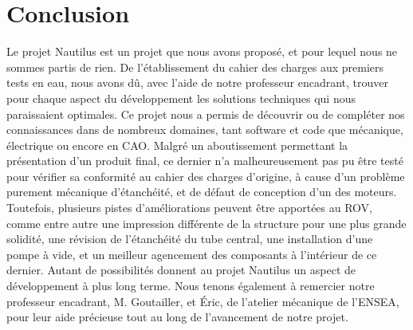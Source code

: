\documentclass[a4paper,11pt]{report}
\begin{document}
\chapter{Conclusion}

Le projet Nautilus est un projet que nous avons proposé, et pour lequel nous ne sommes partis de rien. De l'établissement du cahier des charges aux premiers tests en eau, nous avons dû, avec l'aide de notre professeur encadrant, trouver pour chaque aspect du développement les solutions techniques qui nous paraissaient optimales. Ce projet nous a permis de découvrir ou de compléter nos connaissances dans de nombreux domaines, tant software et code que mécanique, électrique ou encore en CAO. Malgré un aboutissement permettant la présentation d'un produit final, ce dernier n'a malheureusement pas pu être testé pour vérifier sa conformité au cahier des charges d'origine, à cause d'un problème purement mécanique d'étanchéité, et de défaut de conception d'un des moteurs. Toutefois, plusieurs pistes d'améliorations peuvent être apportées au ROV, comme entre autre une impression différente de la structure pour une plus grande solidité, une révision de l'étanchéité du tube central, une installation d'une pompe à vide, et un meilleur agencement des composants à l'intérieur de ce dernier. Autant de possibilités donnent au projet Nautilus un aspect de développement à plus long terme.
\newline\newline Nous tenons également à remercier notre professeur encadrant, M. Goutailler, et Éric, de l'atelier mécanique de l'ENSEA, pour leur aide précieuse tout au long de l'avancement de notre projet.



\listoffigures
\end{document}
